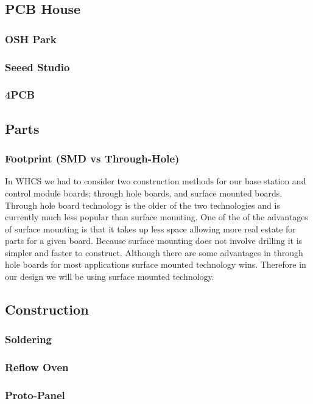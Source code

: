 \tbw

\subsection{PCB House}

\subsubsection{OSH Park}

\subsubsection{Seeed Studio}

\subsubsection{4PCB}

\subsection{Parts}

\subsubsection{Footprint (SMD vs Through-Hole)}
In WHCS we had to consider two construction methods for our base station and
control module boards; through hole boards, and surface mounted boards. Through
hole board technology is the older of the two technologies and is currently
much less popular than surface mounting. One of the of the advantages of
surface mounting is that it takes up less space allowing more real estate for
parts for a given board. Because surface mounting does not involve drilling it
is simpler and faster to construct. Although there are some advantages in
through hole boards for most applications surface mounted technology wins.
Therefore in our design we will be using surface mounted technology.

\subsection{Construction}

\subsubsection{Soldering}

\subsubsection{Reflow Oven}

\subsubsection{Proto-Panel}
\label{sec:proto-panel}


